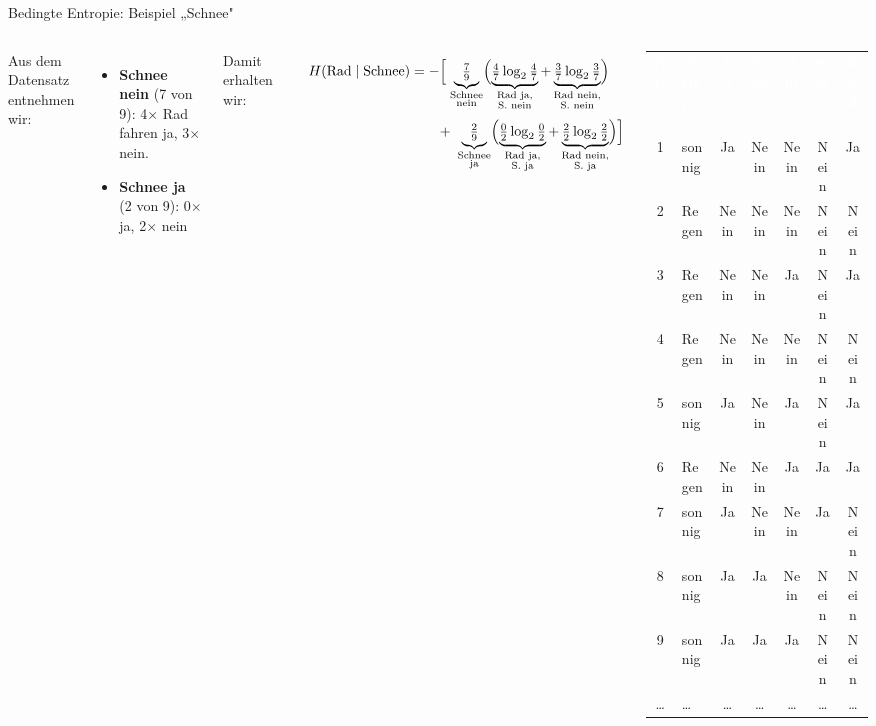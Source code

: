\begin{frame}{Bedingte Entropie: Beispiel „Schnee"}
\begin{columns}
\footnotesize
Aus dem Datensatz entnehmen wir:
\begin{itemize}
  \item \textbf{Schnee nein} (7 von 9): 4$\times$ Rad fahren ja,
        3$\times$ nein.
  \item \textbf{Schnee ja} (2 von 9): 0$\times$ ja, 2$\times$ nein
\end{itemize}

Damit erhalten wir: 

\vspace{0.6em}
\[
  H(\text{Rad} \mid \text{Schnee}) = -\Bigl[\;
    \underbrace{\tfrac{7}{9}}_{\substack{\text{Schnee}\\\text{nein}}}
    \Bigl(
      \underbrace{\tfrac{4}{7}\log_2\tfrac{4}{7}}_{\substack{\text{Rad ja,}\\\text{S. nein}}}
      +
      \underbrace{\tfrac{3}{7}\log_2\tfrac{3}{7}}_{\substack{\text{Rad nein,}\\\text{S. nein}}}
    \Bigr)
\]
\[
  \phantom{H(\text{Rad} \mid \text{Schnee}) = -\Bigl[\;}
    +\;
    \underbrace{\tfrac{2}{9}}_{\substack{\text{Schnee}\\\text{ja}}}
    \Bigl(
      \underbrace{\tfrac{0}{2}\log_2\tfrac{0}{2}}_{\substack{\text{Rad ja,}\\\text{S. ja}}}
      +
      \underbrace{\tfrac{2}{2}\log_2\tfrac{2}{2}}_{\substack{\text{Rad nein,}\\\text{S. ja}}}
    \Bigr)
  \Bigr]
\]



\centering
{\scriptsize
\renewcommand{\arraystretch}{1.25}
\setlength{\tabcolsep}{3pt}
\begin{tabular}{c l c c c c c}
\rowcolor{PrimaryColor}
\textcolor{white}{\textbf{Nr.}} &
\textcolor{white}{\textbf{Wetter}} &
\textcolor{white}{\textbf{Son.?}} &
\textcolor{white}{\textbf{Schnee}} &
\textcolor{white}{\textbf{Auto}} &
\textcolor{white}{\textbf{Start}} &
\textcolor{white}{\textbf{Rad}}\\
1 & sonnig & Ja   & Nein & Nein & Nein & Ja\\
2 & Regen  & Nein & Nein & Nein & Nein & Nein\\
3 & Regen  & Nein & Nein & Ja   & Nein & Ja\\
4 & Regen  & Nein & Nein & Nein & Nein & Nein\\
5 & sonnig & Ja   & Nein & Ja   & Nein & Ja\\
6 & Regen  & Nein & Nein & Ja   & Ja   & Ja\\
7 & sonnig & Ja   & Nein & Nein & Ja   & Nein\\
8 & sonnig & Ja   & Ja   & Nein & Nein & Nein\\
9 & sonnig & Ja   & Ja   & Ja   & Nein & Nein\\
\dots & \dots & \dots & \dots & \dots & \dots & \dots\\
\end{tabular}}
\end{columns}
\end{frame}


